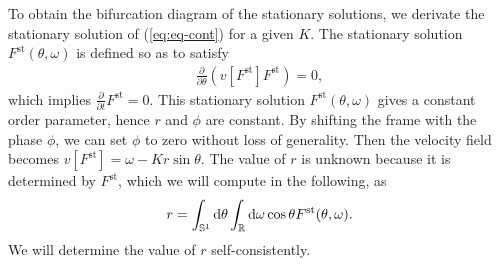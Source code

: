 To obtain the bifurcation diagram of the stationary solutions,
we derivate the stationary solution of (\ref{eq:eq-cont}) for a given $K$.
The stationary solution $F^{\mathrm{st}}(\theta,\omega)$ is defined so as to satisfy
\begin{align}
  \frac{\partial}{\partial\theta}(v[F^{\mathrm{st}}]F^{\mathrm{st}})=0,
  \label{eq:stationarity}
\end{align}
which implies $\frac{\partial}{\partial t}F^{\mathrm{st}}=0$.
This stationary solution $F^{\mathrm{st}}(\theta,\omega)$ gives a constant order parameter,
hence $r$ and $\phi$ are constant.
By shifting the frame with the phase $\phi$,
we can set $\phi$ to zero without loss of generality.
Then the velocity field becomes $v[F^{\mathrm{st}}]=\omega-Kr\sin\theta$.
The value of $r$ is unknown
because it is determined by $F^{\mathrm{st}}$, which we will compute in the following, as
\begin{align}
  r=\int_{\mathbb{S}^{1}}\mathrm{d}\theta\int_{\mathbb{R}}\mathrm{d}\omega\cos\theta F^{\mathrm{st}}(\theta,\omega).
\end{align}
We will determine the value of $r$ self-consistently.

